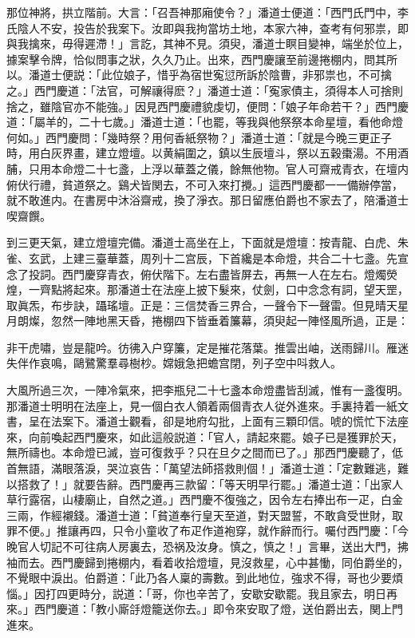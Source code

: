 那位神將，拱立階前。大言：「召吾神那廂使令？」潘道士便道：「西門氏門中，李氏陰人不安，投告於我案下。汝即與我拘當坊土地，本家六神，查考有何邪祟，即與我擒來，毋得遲滯！」言訖，其神不見。須臾，潘道士瞑目變神，端坐於位上，據案擊令牌，恰似問事之狀，久久乃止。出來，西門慶讓至前邊捲棚内，問其所以。潘道士便説：「此位娘子，惜乎為宿世寃愆所訴於陰曹，非邪祟也，不可擒之。」西門慶道：「法官，可解禳得麽？」潘道士道：「寃家債主，須得本人可捨則捨之，雖陰官亦不能強。」因見西門慶禮貌虔切，便問：「娘子年命若干？」西門慶道：「屬羊的，二十七歲。」潘道士道：「也罷，等我與他祭祭本命星壇，看他命燈何如。」西門慶問：「幾時祭？用何香紙祭物？」潘道士道：「就是今晚三更正子時，用白灰界畫，建立燈壇。以黄絹圍之，鎮以生辰壇斗，祭以五穀棗湯。不用酒脯，只用本命燈二十七盞，上浮以華蓋之儀，餘無他物。官人可齋戒青衣，在壇内俯伏行禮，貧道祭之。鷄犬皆関去，不可入來打攪。」這西門慶都一一備辦停當，就不敢進内。在書房中沐浴齋戒，換了淨衣。那日留應伯爵也不家去了，陪潘道士喫齋饌。

到三更天氣，建立燈壇完備。潘道士高坐在上，下面就是燈壇：按青龍、白虎、朱雀、玄武，上建三臺華蓋，周列十二宫辰，下首纔是本命燈，共合二十七盞。先宣念了投詞。西門慶穿青衣，俯伏階下。左右盡皆屏去，再無一人在左右。燈燭熒煌，一齊點將起來。那潘道士在法座上披下髮來，仗劍，口中念念有詞，望天罡，取眞炁，布步訣，躡瑤壇。正是：三信焚香三界合，一聲令下一聲雷。但見晴天星月朗燦，忽然一陣地黑天昏，捲棚四下皆垂着簾幕，須臾起一陣怪風所過，正是：

非干虎嘯，豈是龍吟。彷彿入户穿簾，定是摧花落葉。推雲出岫，送雨歸川。雁迷失伴作哀鳴，鷗鷺驚羣尋樹杪。嫦娥急把蟾宫閉，列子空中呌救人。

大風所過三次，一陣冷氣來，把李瓶兒二十七盞本命燈盡皆刮滅，惟有一盞復明。那潘道士明明在法座上，見一個白衣人領着兩個青衣人従外進來。手裏持着一紙文書，呈在法案下。潘道士觀看，卻是地府勾批，上面有三顆印信。唬的慌忙下法座來，向前喚起西門慶來，如此這般説道：「官人，請起來罷。娘子已是獲罪於天，無所禱也。本命燈已滅，豈可復救乎？只在旦夕之間而已了。」那西門慶聽了，低首無語，滿眼落淚，哭泣哀告：「萬望法師搭救則個！」潘道士道：「定數難逃，難以搭救了！」就要告辭。西門慶再三款留：「等天明早行罷。」潘道士道：「出家人草行露宿，山棲廟止，自然之道。」西門慶不復強之，因令左右捧出布一疋，白金三兩，作經襯錢。潘道士道：「貧道奉行皇天至道，對天盟誓，不敢貪受世財，取罪不便。」推讓再四，只令小童收了布疋作道袍穿，就作辭而行。囑付西門慶：「今晚官人切記不可往病人房裏去，恐祸及汝身。慎之，慎之！」言畢，送出大門，拂袖而去。西門慶歸到捲棚内，看着收拾燈壇，見沒救星，心中甚慟，同伯爵坐的，不覺眼中淚出。伯爵道：「此乃各人稟的壽數。到此地位，強求不得，哥也少要煩惱。」因打四更時分，説道：「哥，你也辛苦了，安歇安歇罷。我且家去，明日再來。」西門慶道：「教小廝㧱燈籠送你去。」即令來安取了燈，送伯爵出去，関上門進來。

